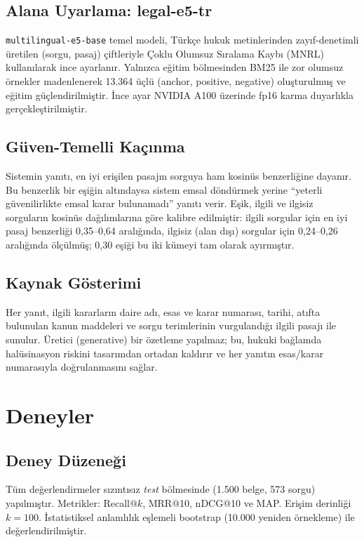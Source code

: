 \documentclass[conference]{IEEEtran}
\begin{document}
\subsection{Alana Uyarlama: legal-e5-tr}
\texttt{multilingual-e5-base} temel modeli, Türkçe hukuk metinlerinden zayıf-denetimli üretilen (sorgu, pasaj) çiftleriyle Çoklu Olumsuz Sıralama Kaybı (MNRL) kullanılarak ince ayarlanır. Yalnızca eğitim bölmesinden BM25 ile zor olumsuz örnekler madenlenerek 13.364 üçlü (anchor, positive, negative) oluşturulmuş ve eğitim güçlendirilmiştir. İnce ayar NVIDIA A100 üzerinde fp16 karma duyarlıkla gerçekleştirilmiştir.

\subsection{Güven-Temelli Kaçınma}
Sistemin yanıtı, en iyi erişilen pasajın sorguya ham kosinüs benzerliğine dayanır. Bu benzerlik bir eşiğin altındaysa sistem emsal döndürmek yerine ``yeterli güvenilirlikte emsal karar bulunamadı'' yanıtı verir. Eşik, ilgili ve ilgisiz sorguların kosinüs dağılımlarına göre kalibre edilmiştir: ilgili sorgular için en iyi pasaj benzerliği 0,35--0,64 aralığında, ilgisiz (alan dışı) sorgular için 0,24--0,26 aralığında ölçülmüş; 0,30 eşiği bu iki kümeyi tam olarak ayırmıştır.

\subsection{Kaynak Gösterimi}
Her yanıt, ilgili kararların daire adı, esas ve karar numarası, tarihi, atıfta bulunulan kanun maddeleri ve sorgu terimlerinin vurgulandığı ilgili pasajı ile sunulur. Üretici (generative) bir özetleme yapılmaz; bu, hukuki bağlamda halüsinasyon riskini tasarımdan ortadan kaldırır ve her yanıtın esas/karar numarasıyla doğrulanmasını sağlar.

\section{Deneyler}
\subsection{Deney Düzeneği}
Tüm değerlendirmeler sızıntısız \emph{test} bölmesinde (1.500 belge, 573 sorgu) yapılmıştır. Metrikler: Recall@$k$, MRR@10, nDCG@10 ve MAP. Erişim derinliği $k=100$. İstatistiksel anlamlılık eşlemeli bootstrap (10.000 yeniden örnekleme) ile değerlendirilmiştir.
\end{document}
